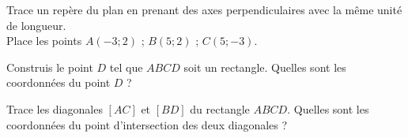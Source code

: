 \begin{myenumerate}
\item Trace un repère du plan en prenant des axes perpendiculaires avec la même unité de longueur.\\Place les points $A(-3;2)$ ; $B(5;2)$ ; $C(5;-3)$.
\item Construis le point $D$ tel que $ABCD$ soit un rectangle. Quelles sont les coordonnées du point $D$ ?
\item Trace les diagonales $[AC]$ et $[BD]$ du rectangle $ABCD$. Quelles sont les coordonnées du point d'intersection des deux diagonales ?
\end{myenumerate}